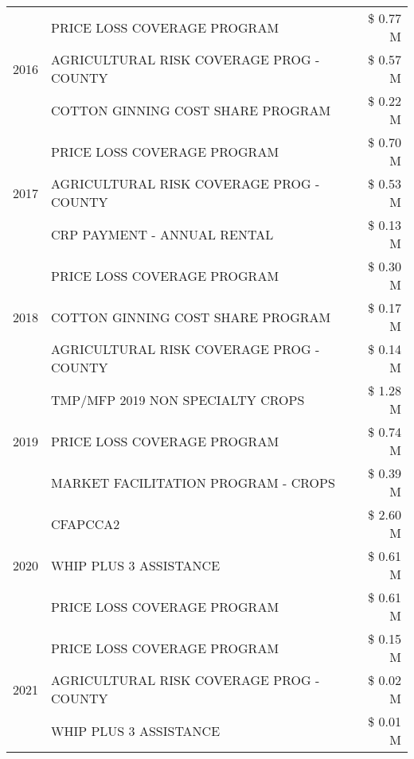 \begin{tabular}{llr}
\cline{1-3}
\multirow[t]{3}{*}{2016} & PRICE LOSS COVERAGE PROGRAM                   & \$ 0.77 M \\
 & AGRICULTURAL RISK COVERAGE PROG - COUNTY      & \$ 0.57 M \\
 & COTTON GINNING COST SHARE PROGRAM             & \$ 0.22 M \\
\cline{1-3}
\multirow[t]{3}{*}{2017} & PRICE LOSS COVERAGE PROGRAM & \$ 0.70 M \\
 & AGRICULTURAL RISK COVERAGE PROG - COUNTY & \$ 0.53 M \\
 & CRP PAYMENT - ANNUAL RENTAL & \$ 0.13 M \\
\cline{1-3}
\multirow[t]{3}{*}{2018} & PRICE LOSS COVERAGE PROGRAM & \$ 0.30 M \\
 & COTTON GINNING COST SHARE PROGRAM & \$ 0.17 M \\
 & AGRICULTURAL RISK COVERAGE PROG - COUNTY & \$ 0.14 M \\
\cline{1-3}
\multirow[t]{3}{*}{2019} & TMP/MFP 2019 NON SPECIALTY CROPS & \$ 1.28 M \\
 & PRICE LOSS COVERAGE PROGRAM & \$ 0.74 M \\
 & MARKET FACILITATION PROGRAM - CROPS & \$ 0.39 M \\
\cline{1-3}
\multirow[t]{3}{*}{2020} & CFAPCCA2 & \$ 2.60 M \\
 & WHIP PLUS 3 ASSISTANCE & \$ 0.61 M \\
 & PRICE LOSS COVERAGE PROGRAM & \$ 0.61 M \\
\cline{1-3}
\multirow[t]{3}{*}{2021} & PRICE LOSS COVERAGE PROGRAM & \$ 0.15 M \\
 & AGRICULTURAL RISK COVERAGE PROG - COUNTY & \$ 0.02 M \\
 & WHIP PLUS 3 ASSISTANCE & \$ 0.01 M \\
\cline{1-3}
\bottomrule
\end{tabular}
